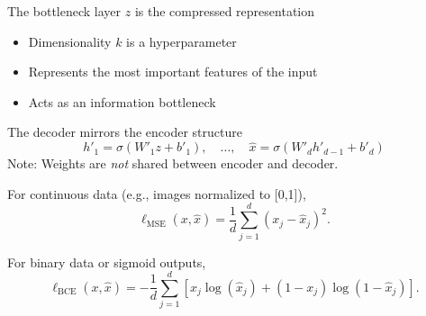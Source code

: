 The bottleneck layer $z$ is the compressed representation
\begin{itemize}
	\item Dimensionality $k$ is a hyperparameter
	\item Represents the most important features of the input
	\item Acts as an information bottleneck
\end{itemize}

The decoder mirrors the encoder structure
\[
h'_1 = \sigma(W'_1 z + b'_1), \quad \dots, \quad \hat{x} = \sigma(W'_d h'_{d-1} + b'_d)
\]
Note: Weights are \textit{not} shared between encoder and decoder.


For continuous data (e.g., images normalized to [0,1]),
\[
\ell_{\text{MSE}}(x, \hat{x}) = \frac{1}{d} \sum_{j=1}^d (x_j - \hat{x}_j)^2.
\]

For binary data or sigmoid outputs,
\[
\ell_{\text{BCE}}(x, \hat{x}) = -\frac{1}{d} \sum_{j=1}^d [x_j \log(\hat{x}_j) + (1 - x_j)\log(1 - \hat{x}_j)].
\]

